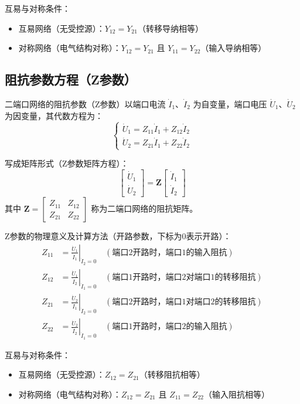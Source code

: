 互易与对称条件：
\begin{itemize}
    \item 互易网络（无受控源）：$Y_{12} = Y_{21}$（转移导纳相等）
    \item 对称网络（电气结构对称）：$Y_{12} = Y_{21}$ 且 $Y_{11} = Y_{22}$（输入导纳相等）
\end{itemize}

\subsection{阻抗参数方程（Z参数）}
二端口网络的阻抗参数（Z参数）以端口电流 $\dot{I}_1\text{、}\dot{I}_2$ 为自变量，端口电压 $\dot{U}_1\text{、}\dot{U}_2$ 为因变量，其代数方程为：
\[
\begin{cases} 
\dot{U}_1 = Z_{11}\dot{I}_1 + Z_{12}\dot{I}_2 \\ 
\dot{U}_2 = Z_{21}\dot{I}_1 + Z_{22}\dot{I}_2 
\end{cases}
\]

写成矩阵形式（Z参数矩阵方程）：
\[
\begin{bmatrix} 
\dot{U}_1 \\ 
\dot{U}_2 
\end{bmatrix} = 
\mathbf{Z}
\begin{bmatrix} 
\dot{I}_1 \\ 
\dot{I}_2 
\end{bmatrix}
\]
其中 $\mathbf{Z} = \begin{bmatrix} Z_{11} & Z_{12} \\ Z_{21} & Z_{22} \end{bmatrix}$ 称为二端口网络的阻抗矩阵。

Z参数的物理意义及计算方法（开路参数，下标为0表示开路）：
\[
\begin{aligned}
Z_{11} &= \left. \frac{\dot{U}_1}{\dot{I}_1} \right|_{\dot{I}_2 = 0} \quad (\text{端口2开路时，端口1的输入阻抗}) \\
Z_{12} &= \left. \frac{\dot{U}_1}{\dot{I}_2} \right|_{\dot{I}_1 = 0} \quad (\text{端口1开路时，端口2对端口1的转移阻抗}) \\
Z_{21} &= \left. \frac{\dot{U}_2}{\dot{I}_1} \right|_{\dot{I}_2 = 0} \quad (\text{端口2开路时，端口1对端口2的转移阻抗}) \\
Z_{22} &= \left. \frac{\dot{U}_2}{\dot{I}_2} \right|_{\dot{I}_1 = 0} \quad (\text{端口1开路时，端口2的输入阻抗})
\end{aligned}
\]

互易与对称条件：
\begin{itemize}
    \item 互易网络（无受控源）：$Z_{12} = Z_{21}$（转移阻抗相等）
    \item 对称网络（电气结构对称）：$Z_{12} = Z_{21}$ 且 $Z_{11} = Z_{22}$（输入阻抗相等）
\end{itemize}

